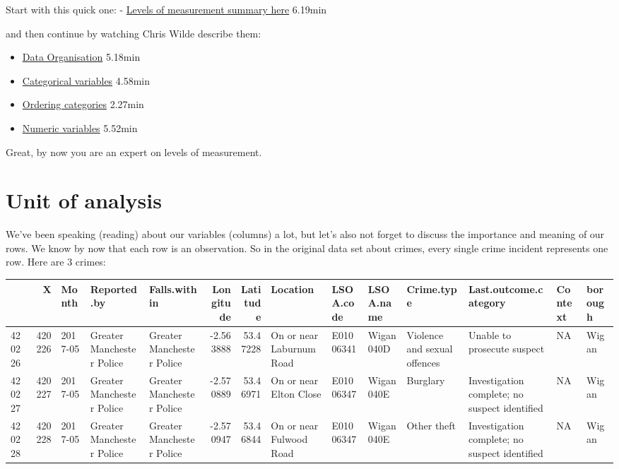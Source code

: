 \documentclass[
]{book}
\providecommand{\tightlist}{%
  \setlength{\itemsep}{0pt}\setlength{\parskip}{0pt}}
\begin{document}
Start with this quick one: - \href{https://www.youtube.com/watch?v=hZxnzfnt5v8}{Levels of measurement summary here} 6.19min

and then continue by watching Chris Wilde describe them:

\begin{itemize}
\tightlist
\item
  \href{https://www.youtube.com/watch?v=_ROBwTFVldo\&list=PL8CRAVedURQpYNoFt7w6maxaQCn3ZLytu\&index=3}{Data Organisation} 5.18min
\item
  \href{https://www.youtube.com/watch?v=38oQwFeCEag\&list=PL8CRAVedURQrlxeFfme0TEgaj1_h67JUR\&index=2}{Categorical variables} 4.58min
\item
  \href{https://www.youtube.com/watch?v=xmRuRRHsUeg\&index=3\&list=PL8CRAVedURQrlxeFfme0TEgaj1_h67JUR}{Ordering categories} 2.27min
\item
  \href{https://www.youtube.com/watch?v=U3lk2nQYfAQ\&list=PL8CRAVedURQrlxeFfme0TEgaj1_h67JUR\&index=4}{Numeric variables} 5.52min
\end{itemize}

Great, by now you are an expert on levels of measurement.

\hypertarget{unit-of-analysis}{%
\section{Unit of analysis}\label{unit-of-analysis}}

We've been speaking (reading) about our variables (columns) a lot, but let's also not forget to discuss the importance and meaning of our rows. We know by now that each row is an observation. So in the original data set about crimes, every single crime incident represents one row. Here are 3 crimes:

\begin{tabular}{l|r|l|l|l|r|r|l|l|l|l|l|l|l}
\hline
  & X & Month & Reported.by & Falls.within & Longitude & Latitude & Location & LSOA.code & LSOA.name & Crime.type & Last.outcome.category & Context & borough\\
\hline
420226 & 420226 & 2017-05 & Greater Manchester Police & Greater Manchester Police & -2.563888 & 53.47228 & On or near Laburnum Road & E01006341 & Wigan 040D & Violence and sexual offences & Unable to prosecute suspect & NA & Wigan\\
\hline
420227 & 420227 & 2017-05 & Greater Manchester Police & Greater Manchester Police & -2.570889 & 53.46971 & On or near Elton Close & E01006347 & Wigan 040E & Burglary & Investigation complete; no suspect identified & NA & Wigan\\
\hline
420228 & 420228 & 2017-05 & Greater Manchester Police & Greater Manchester Police & -2.570947 & 53.46844 & On or near Fulwood Road & E01006347 & Wigan 040E & Other theft & Investigation complete; no suspect identified & NA & Wigan\\
\hline
\end{tabular}
\end{document}
